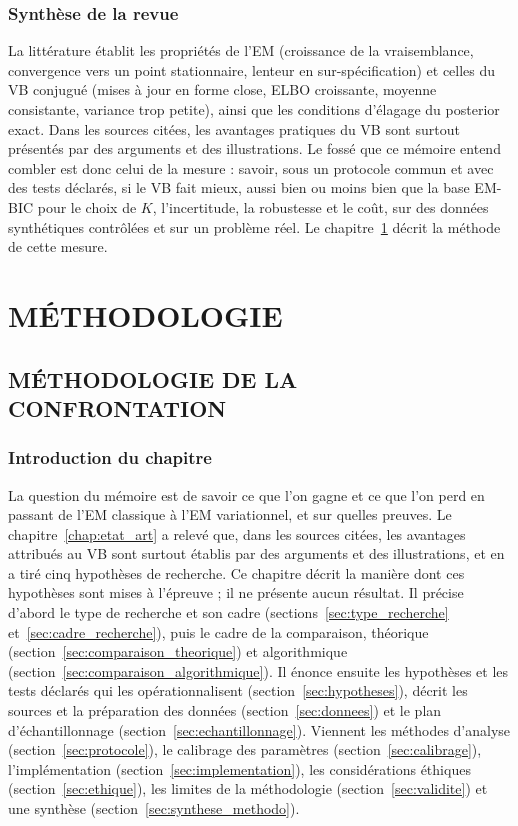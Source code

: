 \section{Synthèse de la revue}\label{sec:ea_synthese}
La littérature établit les propriétés de l'EM (croissance de la vraisemblance, convergence vers un point stationnaire, lenteur en sur-spécification) et celles du VB conjugué (mises à jour en forme close, ELBO croissante, moyenne consistante, variance trop petite), ainsi que les conditions d'élagage du posterior exact. Dans les sources citées, les avantages pratiques du VB sont surtout présentés par des arguments et des illustrations. Le fossé que ce mémoire entend combler est donc celui de la mesure : savoir, sous un protocole commun et avec des tests déclarés, si le VB fait mieux, aussi bien ou moins bien que la base EM-BIC pour le choix de $K$, l'incertitude, la robustesse et le coût, sur des données synthétiques contrôlées et sur un problème réel. Le chapitre~\ref{chap:methodologie} décrit la méthode de cette mesure.


\part{MÉTHODOLOGIE}

\chapter{MÉTHODOLOGIE DE LA CONFRONTATION}\label{chap:methodologie}
\section{Introduction du chapitre}\label{sec:intro_methodo}
La question du mémoire est de savoir ce que l'on gagne et ce que l'on perd en passant de l'EM classique à l'EM variationnel, et sur quelles preuves. Le chapitre~\ref{chap:etat_art} a relevé que, dans les sources citées, les avantages attribués au VB sont surtout établis par des arguments et des illustrations, et en a tiré cinq hypothèses de recherche. Ce chapitre décrit la manière dont ces hypothèses sont mises à l'épreuve ; il ne présente aucun résultat. Il précise d'abord le type de recherche et son cadre (sections~\ref{sec:type_recherche} et~\ref{sec:cadre_recherche}), puis le cadre de la comparaison, théorique (section~\ref{sec:comparaison_theorique}) et algorithmique (section~\ref{sec:comparaison_algorithmique}). Il énonce ensuite les hypothèses et les tests déclarés qui les opérationnalisent (section~\ref{sec:hypotheses}), décrit les sources et la préparation des données (section~\ref{sec:donnees}) et le plan d'échantillonnage (section~\ref{sec:echantillonnage}). Viennent les méthodes d'analyse (section~\ref{sec:protocole}), le calibrage des paramètres (section~\ref{sec:calibrage}), l'implémentation (section~\ref{sec:implementation}), les considérations éthiques (section~\ref{sec:ethique}), les limites de la méthodologie (section~\ref{sec:validite}) et une synthèse (section~\ref{sec:synthese_methodo}).

